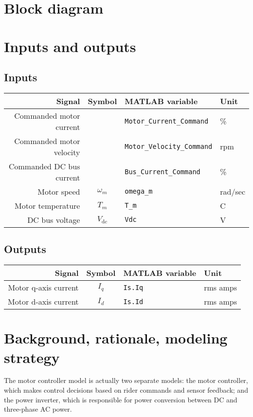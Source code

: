 \documentclass[../SimBALink.tex]{subfiles}
\begin{document}
\section{Block diagram}

\section{Inputs and outputs}
	\subsection{Inputs}
	\begin{tabular}{ r | c | l | l }
		Signal						&	Symbol				&	MATLAB variable				&	Unit						\\\hline	
		Commanded motor current		&						&	\texttt{Motor\_Current\_Command}	&	\%					\\
		Commanded motor velocity		&						&	\texttt{Motor\_Velocity\_Command}	&	rpm			\\
		Commanded DC bus current		&						&	\texttt{Bus\_Current\_Command}	&	\%			\\
		Motor speed					&	$\omega_m$			&	\texttt{omega\_m}				&	rad/sec		\\
		Motor temperature				&	$T_m$				&	\texttt{T\_m}					&	\degree C		\\
		DC bus voltage				&	$V_\text{dc}$			&	\texttt{Vdc}					&	V
	\end{tabular}
	
	\subsection{Outputs}
		\begin{tabular}{ r | c | l | l }
			Signal						&	Symbol				&	MATLAB variable	&	Unit						\\\hline	
			Motor q-axis current			&	$I_q$				&	\texttt{Is.Iq}		&	rms amps			\\
			Motor d-axis current			&	$I_d$				&	\texttt{Is.Id}		&	rms amps
		\end{tabular}
	
\section{Background, rationale, modeling strategy}
	The motor controller model is actually two separate models: the motor controller, which makes control decisions based on rider commands and sensor feedback; and the power inverter, which is responsible for power conversion between DC and three-phase AC power.
	
\end{document}
